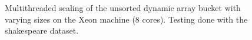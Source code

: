 \begin{landscape}
\begin{figure}[!h]
{        }
        \label{fig:ts_ask_shake_unsorted}
        \caption{Multithreaded scaling of the unsorted dynamic array bucket with varying sizes on the
        Xeon machine (8 cores). Testing done with the shakespeare dataset.}
    \end{figure}
    \begin{figure}[!h]
\end{figure}
\end{landscape}
